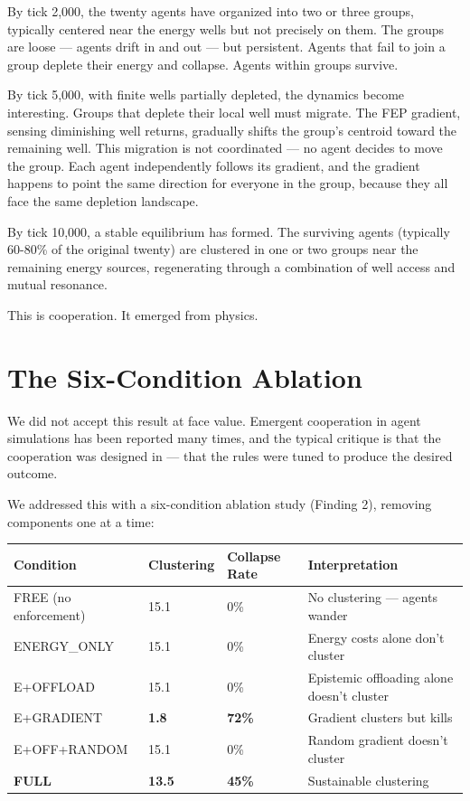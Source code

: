 By tick 2,000, the twenty agents have organized into two or three groups, typically centered near the energy wells but not precisely on them. The groups are loose --- agents drift in and out --- but persistent. Agents that fail to join a group deplete their energy and collapse. Agents within groups survive.

By tick 5,000, with finite wells partially depleted, the dynamics become interesting. Groups that deplete their local well must migrate. The FEP gradient, sensing diminishing well returns, gradually shifts the group's centroid toward the remaining well. This migration is not coordinated --- no agent decides to move the group. Each agent independently follows its gradient, and the gradient happens to point the same direction for everyone in the group, because they all face the same depletion landscape.

By tick 10,000, a stable equilibrium has formed. The surviving agents (typically 60-80\% of the original twenty) are clustered in one or two groups near the remaining energy sources, regenerating through a combination of well access and mutual resonance.

This is cooperation. It emerged from physics.

\section{The Six-Condition Ablation}\label{the-six-condition-ablation}

We did not accept this result at face value. Emergent cooperation in agent simulations has been reported many times, and the typical critique is that the cooperation was designed in --- that the rules were tuned to produce the desired outcome.

We addressed this with a six-condition ablation study (Finding 2), removing components one at a time:

\begin{longtable}[]{@{}llll@{}}
\toprule\noalign{}
Condition & Clustering & Collapse Rate & Interpretation \\
\midrule\noalign{}
\endhead
\bottomrule\noalign{}
\endlastfoot
FREE (no enforcement) & 15.1 & 0\% & No clustering --- agents wander \\
ENERGY\_ONLY & 15.1 & 0\% & Energy costs alone don't cluster \\
E+OFFLOAD & 15.1 & 0\% & Epistemic offloading alone doesn't cluster \\
E+GRADIENT & \textbf{1.8} & \textbf{72\%} & Gradient clusters but kills \\
E+OFF+RANDOM & 15.1 & 0\% & Random gradient doesn't cluster \\
\textbf{FULL} & \textbf{13.5} & \textbf{45\%} & Sustainable clustering \\
\end{longtable}

